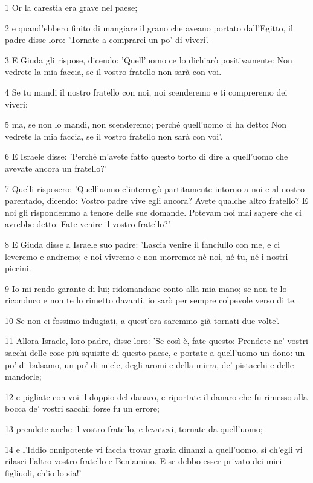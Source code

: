 \par 1 Or la carestia era grave nel paese;
\par 2 e quand'ebbero finito di mangiare il grano che aveano portato dall'Egitto, il padre disse loro: 'Tornate a comprarci un po' di viveri'.
\par 3 E Giuda gli rispose, dicendo: 'Quell'uomo ce lo dichiarò positivamente: Non vedrete la mia faccia, se il vostro fratello non sarà con voi.
\par 4 Se tu mandi il nostro fratello con noi, noi scenderemo e ti compreremo dei viveri;
\par 5 ma, se non lo mandi, non scenderemo; perché quell'uomo ci ha detto: Non vedrete la mia faccia, se il vostro fratello non sarà con voi'.
\par 6 E Israele disse: 'Perché m'avete fatto questo torto di dire a quell'uomo che avevate ancora un fratello?'
\par 7 Quelli risposero: 'Quell'uomo c'interrogò partitamente intorno a noi e al nostro parentado, dicendo: Vostro padre vive egli ancora? Avete qualche altro fratello? E noi gli rispondemmo a tenore delle sue domande. Potevam noi mai sapere che ci avrebbe detto: Fate venire il vostro fratello?'
\par 8 E Giuda disse a Israele suo padre: 'Lascia venire il fanciullo con me, e ci leveremo e andremo; e noi vivremo e non morremo: né noi, né tu, né i nostri piccini.
\par 9 Io mi rendo garante di lui; ridomandane conto alla mia mano; se non te lo riconduco e non te lo rimetto davanti, io sarò per sempre colpevole verso di te.
\par 10 Se non ci fossimo indugiati, a quest'ora saremmo già tornati due volte'.
\par 11 Allora Israele, loro padre, disse loro: 'Se così è, fate questo: Prendete ne' vostri sacchi delle cose più squisite di questo paese, e portate a quell'uomo un dono: un po' di balsamo, un po' di miele, degli aromi e della mirra, de' pistacchi e delle mandorle;
\par 12 e pigliate con voi il doppio del danaro, e riportate il danaro che fu rimesso alla bocca de' vostri sacchi; forse fu un errore;
\par 13 prendete anche il vostro fratello, e levatevi, tornate da quell'uomo;
\par 14 e l'Iddio onnipotente vi faccia trovar grazia dinanzi a quell'uomo, sì ch'egli vi rilasci l'altro vostro fratello e Beniamino. E se debbo esser privato dei miei figliuoli, ch'io lo sia!'
